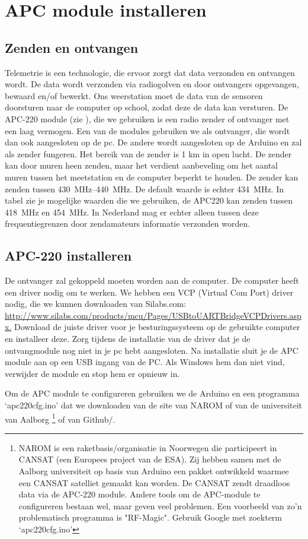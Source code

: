 \section{APC module installeren}

\subsection{Zenden en ontvangen} Telemetrie is een technologie, die
ervoor zorgt dat data verzonden en ontvangen wordt. De data wordt
verzonden via radiogolven en door ontvangers opgevangen, bewaard en/of
bewerkt. Ons weerstation moet de data van de sensoren doorsturen naar de
\hisparc computer op school, zodat deze de data kan versturen. De
APC-220 module (zie ), die we gebruiken is een
radio zender of ontvanger met een laag vermogen. Een van de modules
gebruiken we als ontvanger, die wordt dan ook aangesloten op de pc. De
andere wordt aangesloten op de Arduino en zal als zender fungeren. Het
bereik van de zender is 1 km in open lucht. De zender kan door muren heen
zenden, maar het verdient aanbeveling om het aantal muren tussen het
meetstation en de computer beperkt te houden. De zender kan zenden
tussen \SIrange{430}{440}{\MHz}. De default waarde is echter
\SI{434}{\MHz}. In tabel zie je mogelijke waarden die we gebruiken, de APC220 
kan zenden tussen \SI{418}{\MHz} en \SI{454}{\MHz}.
In Nederland mag er echter alleen tussen deze frequentiegrenzen door
zendamateurs informatie verzonden worden.


\subsection{APC-220 installeren}
De ontvanger zal gekoppeld moeten worden aan de computer. De computer heeft 
een driver nodig om te werken. We hebben een VCP (Virtual Com Port) driver nodig, 
die we kunnen downloaden van Silabs.com:
\url{http://www.silabs.com/products/mcu/Pages/USBtoUARTBridgeVCPDrivers.aspx.}
Download de juiste driver voor je besturingssysteem op de gebruikte computer
en installeer deze. Zorg tijdens de installatie van de driver dat je de 
ontvangmodule nog niet in je pc hebt aangesloten.
Na installatie sluit je de APC module  aan op een 
USB ingang van de PC. Als Windows hem dan niet vind, verwijder de module en 
stop hem er opnieuw in.

Om de APC module te configureren gebruiken we de Arduino en een
programma `apc220cfg.ino' dat we downloaden van de site van NAROM of van
de universiteit van Aalborg \footnote{NAROM is een
raketbasis/organisatie in Noorwegen die participeert in CANSAT (een
Europees project van de ESA). Zij hebben samen met de Aalborg
universiteit op basis van Arduino een pakket ontwikkeld waarmee een
CANSAT satelliet gemaakt kan worden. De CANSAT zendt draadloos data via
de APC-220 module. Andere tools om de APC-module te configureren bestaan
wel, maar geven veel problemen. Een voorbeeld van zo'n problematisch
programma is "RF-Magic". Gebruik Google met zoekterm `apc220cfg.ino'} of van
Github/\hisparc. 

